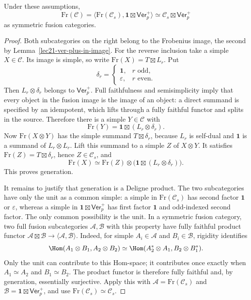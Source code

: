 \begin{lemma}\label{lec22-image-factorization}
Under these assumptions,
\[
 \mathrm{Fr}(\mathcal C)
 =\langle\mathrm{Fr}(\mathcal C_s),
            \mathbf1\boxtimes\mathsf{Ver}_p^+\rangle
 \simeq\mathcal C_s\boxtimes\mathsf{Ver}_p^+
\]
as symmetric fusion categories.
\end{lemma}
\begin{proof}
Both subcategories on the right belong to the Frobenius image, the second
by Lemma~\ref{lec21-ver-plus-in-image}. For the reverse inclusion take a
simple $X\in\mathcal C$. Its image is simple, so write
$\mathrm{Fr}(X)=T\boxtimes L_r$. Put
\[
 \delta_r=
 \begin{cases}\mathbf1,&r\text{ odd},\\
 \varepsilon,&r\text{ even}.
 \end{cases}
\]
Then $L_r\otimes\delta_r$ belongs to $\mathsf{Ver}_p^+$.
Full faithfulness and semisimplicity imply that every object in the
fusion image is the image of an object: a direct summand is specified by
an idempotent, which lifts through a fully faithful functor and splits in
the source. Therefore there is a simple $Y\in\mathcal C$ with
\[
 \mathrm{Fr}(Y)=\mathbf1\boxtimes(L_r\otimes\delta_r).
\]
Now $\mathrm{Fr}(X\otimes Y)$ has the simple summand
$T\boxtimes\delta_r$, because $L_r$ is self-dual and
$\mathbf1$ is a summand of $L_r\otimes L_r$. Lift this summand to a
simple $Z$ of $X\otimes Y$. It satisfies
$\mathrm{Fr}(Z)=T\boxtimes\delta_r$, hence $Z\in\mathcal C_s$, and
\[
 \mathrm{Fr}(X)
 \simeq\mathrm{Fr}(Z)\otimes
       \bigl(\mathbf1\boxtimes(L_r\otimes\delta_r)\bigr).
\]
This proves generation.

It remains to justify that generation is a Deligne product. The two
subcategories have only the unit as a common simple: a simple in
$\mathrm{Fr}(\mathcal C_s)$ has second factor $\mathbf1$ or
$\varepsilon$, whereas a simple in
$\mathbf1\boxtimes\mathsf{Ver}_p^+$ has first factor $\mathbf1$ and
odd-indexed second factor. The only common possibility is the unit.
In a symmetric fusion category, two full fusion subcategories
$\mathcal A,\mathcal B$ with this property have fully faithful product
functor $\mathcal A\boxtimes\mathcal B\to\langle\mathcal A,\mathcal B\rangle$.
Indeed, for simple $A_i\in\mathcal A$ and $B_i\in\mathcal B$, rigidity
identifies
\[
 \Hom(A_1\otimes B_1,A_2\otimes B_2)
 \simeq\Hom(A_2^*\otimes A_1,B_2\otimes B_1^*).
\]
Only the unit can contribute to this Hom-space; it contributes once
exactly when $A_1\simeq A_2$ and $B_1\simeq B_2$. The product functor
is therefore fully faithful and, by generation, essentially surjective.
Apply this with
$\mathcal A=\mathrm{Fr}(\mathcal C_s)$ and
$\mathcal B=\mathbf1\boxtimes\mathsf{Ver}_p^+$, and use
$\mathrm{Fr}(\mathcal C_s)\simeq\mathcal C_s$.
\end{proof}

